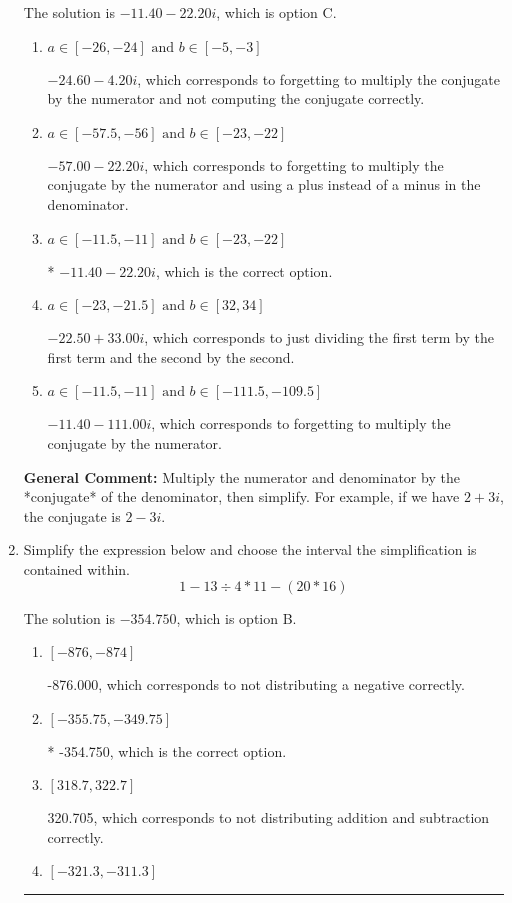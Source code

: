 \documentclass{extbook}[14pt]
\newcommand{\litem}[1]{\item #1

\rule{\textwidth}{0.4pt}}
\begin{document}
\begin{enumerate}
{The solution is \( -11.40  - 22.20 i \), which is option C.\begin{enumerate}[label=\Alph*.]
\item \( a \in [-26, -24] \text{ and } b \in [-5, -3] \)

 $-24.60  - 4.20 i$, which corresponds to forgetting to multiply the conjugate by the numerator and not computing the conjugate correctly.
\item \( a \in [-57.5, -56] \text{ and } b \in [-23, -22] \)

 $-57.00  - 22.20 i$, which corresponds to forgetting to multiply the conjugate by the numerator and using a plus instead of a minus in the denominator.
\item \( a \in [-11.5, -11] \text{ and } b \in [-23, -22] \)

* $-11.40  - 22.20 i$, which is the correct option.
\item \( a \in [-23, -21.5] \text{ and } b \in [32, 34] \)

 $-22.50  + 33.00 i$, which corresponds to just dividing the first term by the first term and the second by the second.
\item \( a \in [-11.5, -11] \text{ and } b \in [-111.5, -109.5] \)

 $-11.40  - 111.00 i$, which corresponds to forgetting to multiply the conjugate by the numerator.
\end{enumerate}

\textbf{General Comment:} Multiply the numerator and denominator by the *conjugate* of the denominator, then simplify. For example, if we have $2+3i$, the conjugate is $2-3i$.
}
\litem{
Simplify the expression below and choose the interval the simplification is contained within.
\[ 1 - 13 \div 4 * 11 - (20 * 16) \]

The solution is \( -354.750 \), which is option B.\begin{enumerate}[label=\Alph*.]
\item \( [-876, -874] \)

 -876.000, which corresponds to not distributing a negative correctly.
\item \( [-355.75, -349.75] \)

* -354.750, which is the correct option.
\item \( [318.7, 322.7] \)

 320.705, which corresponds to not distributing addition and subtraction correctly.
\item \( [-321.3, -311.3] \)


\end{enumerate}}
\end{enumerate}
\end{document}
